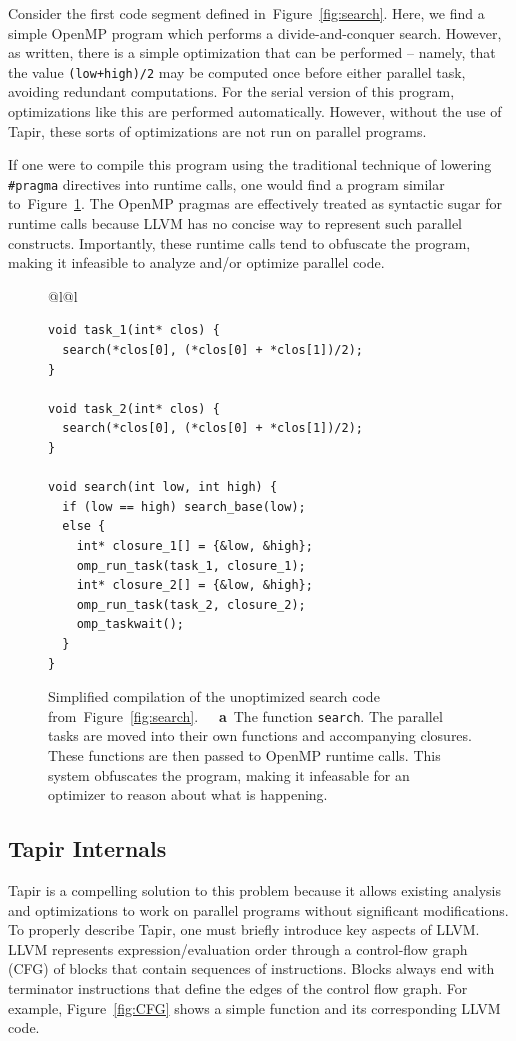 \documentclass[sigconf]{acmart}
\newcommand{\figref}[1]         {Figure~\ref{fig:#1}}
\newcommand{\subfigcap}[1]      {\textbf{~~#1}}
\def\code{\lstinline[basicstyle=\ttfamily\color{CodeColor}]}
\begin{document}
Consider the first code segment defined in~\figref{search}.
Here, we find a simple OpenMP program which performs a divide-and-conquer search.
However, as written, there is a simple optimization that can be performed --
namely, that the value \code{(low+high)/2} may be computed once before either
parallel task, avoiding redundant computations. For
the serial version of this program, optimizations like this are performed
automatically. However, without the use of Tapir, these sorts of optimizations
are not run on parallel programs.

If one were to compile this program using the traditional technique of lowering 
\texttt{\#pragma} directives into runtime calls, one would find a program similar 
to~\figref{runtime_calls}.
The OpenMP pragmas are effectively treated as syntactic sugar for runtime calls
because LLVM has no concise way to represent such parallel constructs.
Importantly, these runtime calls tend to obfuscate the program, making it 
infeasible to analyze and/or optimize parallel code.

\begin{figure}[t]
\begin{tabular*}{\linewidth}{@{\extracolsep{\fill}}l@{}l}
\begin{lstlisting}
void task_1(int* clos) {
  search(*clos[0], (*clos[0] + *clos[1])/2);
}

void task_2(int* clos) {
  search(*clos[0], (*clos[0] + *clos[1])/2);
}

void search(int low, int high) {
  if (low == high) search_base(low);
  else {
    int* closure_1[] = {&low, &high};
    omp_run_task(task_1, closure_1);
    int* closure_2[] = {&low, &high};
    omp_run_task(task_2, closure_2);
    omp_taskwait();
  } 
}
\end{lstlisting}
\vspace{0.1ex}
\end{tabular*}

\caption[Simplified compilation of the unoptimized search code from \figref{search}.]
{Simplified compilation of the unoptimized search code from~\figref{search}.  
\subfigcap{a}~The function \code{search}. The parallel tasks are moved into their own 
functions and accompanying closures. These functions are then passed to OpenMP runtime 
calls. This system obfuscates the program, making it infeasable for an optimizer to 
reason about what is happening.}
  \label{fig:runtime_calls}
\end{figure}

\subsection{Tapir Internals}
Tapir is a compelling solution to this problem because it allows existing
analysis and optimizations to work on parallel programs without significant modifications.
To properly describe Tapir, one must briefly introduce key aspects of LLVM.
LLVM represents expression/evaluation order through a control-flow graph (CFG) of blocks that contain 
sequences of instructions. Blocks always end with terminator instructions that
define the edges of the control flow graph. For example, \figref{CFG} shows a simple
function and its corresponding LLVM code.
\end{document}
